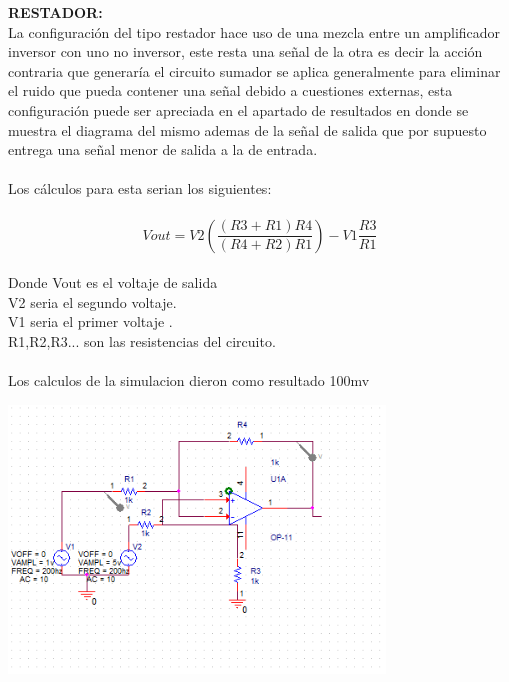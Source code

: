 \documentclass[12pt,a4paper]{article}
\begin{document}
\textbf{RESTADOR:\\}
La configuración del tipo restador hace uso de una mezcla entre un amplificador inversor con uno no inversor, este resta una señal de la otra es decir la acción contraria que generaría el circuito sumador se aplica generalmente para eliminar el ruido que pueda contener una señal debido a cuestiones externas, esta configuración puede ser apreciada en el apartado de resultados en donde se muestra el diagrama del mismo ademas de la señal de salida que por supuesto entrega una señal menor de salida a la de entrada.\\\\
Los cálculos para esta serian los siguientes:\\\\ 

$$ Vout=V2(\frac{(R3+R1)R4}{(R4+R2)R1})-V1\frac{R3}{R1}$$\\
Donde Vout es el voltaje de salida\\
V2 seria el segundo voltaje.\\
V1 seria el primer voltaje .\\
R1,R2,R3... son las resistencias del circuito.\\ 
\\Los calculos de la simulacion dieron como resultado 100mv\\

\begin{center}
\includegraphics[width=10cm]{Simulaciones/res.png} 
\end{center}
\end{document}
